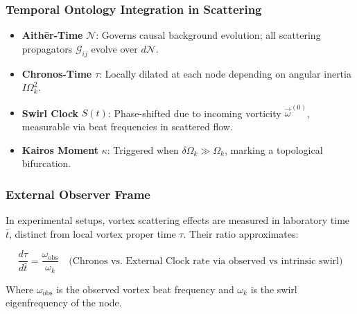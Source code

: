 \subsubsection*{Temporal Ontology Integration in Scattering}

\begin{itemize}
    \item \textbf{Aithēr-Time} \( \mathcal{N} \): Governs causal background evolution; all scattering propagators \( \mathcal{G}_{ij} \) evolve over \( d\mathcal{N} \).
    \item \textbf{Chronos-Time} \( \tau \): Locally dilated at each node depending on angular inertia \( I \Omega_k^2 \).
    \item \textbf{Swirl Clock} \( S(t) \): Phase-shifted due to incoming vorticity \( \vec{\omega}^{(0)} \), measurable via beat frequencies in scattered flow.
    \item \textbf{Kairos Moment} \( \kappa \): Triggered when \(\delta \Omega_k \gg \Omega_k\), marking a topological bifurcation.
\end{itemize}

\subsubsection*{External Observer Frame}

In experimental setups, vortex scattering effects are measured in laboratory time \( \bar{t} \), distinct from local vortex proper time \( \tau \). Their ratio approximates:

\[
    \frac{d\tau}{d\bar{t}} = \frac{\omega_{\text{obs}}}{\omega_k} \quad \text{(Chronos vs. External Clock rate via observed vs intrinsic swirl)}

\]

Where \( \omega_{\text{obs}} \) is the observed vortex beat frequency and \( \omega_k \) is the swirl eigenfrequency of the node.
